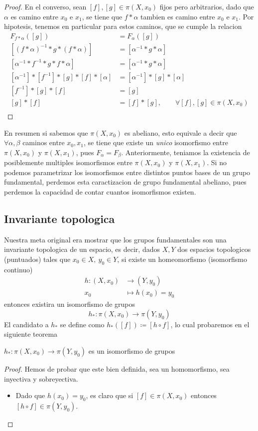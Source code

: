 {\begin{proof}
  En el converso, sean \([f],[g] \in \pi (X, x_0) \) fijos pero
  arbitrarios, dado que \(\alpha\) es camino entre \(x_0\) e \(x_1\), se
  tiene que \(f * \alpha\) tambien es camino entre \(x_0\) e \(x_1\).
Por hipotesis, tenemos en particular para estos caminos, que se cumple
la relacion
  \begin{align*}
    F_{f * \alpha} ([g]) &= F_{\alpha} ([g]) \\
    [(f * \alpha)^{-1} * g * (f * \alpha) ] &= [\alpha^{-1} * g * \alpha] \\
    [\alpha^{-1} * f^{-1} * g * f * \alpha ] &= [\alpha^{-1} * g * \alpha] \\
    [\alpha^{-1}] * [f^{-1}] * [g] * [f] * [\alpha] &= [\alpha^{-1}] *
        [g] * [\alpha] \\
    [f^{-1}] * [g] * [f] &= [g] \\
    [g] * [f] &= [f] * [g], \qquad \forall [f],[g] \in \pi (X, x_0) \\
  \end{align*}
\end{proof}
En resumen si sabemos que \(\pi (X, x_0)\) es abeliano, esto equivale a
decir que \(\forall \alpha,\beta\) caminos entre \(x_0, x_1\), se tiene
que existe un \emph{unico} isomorfismo entre \(\pi (X,x_0) \) y \( \pi
(X,x_1)\), pues \(F_\alpha = F_\beta\). Anteriormente, teniamos la
existencia de posiblemente multiples isomorfismos entre \(\pi (X, x_0)
\) y \(\pi (X, x_1) \). Si no podemos parametrizar los isomorfismos
entre distintos puntos bases de un grupo fundamental, perdemos esta
caractizacion de grupo fundamental abeliano, pues perdemos la capacidad
de contar cuantos isomorfismos existen.

\subsection{Invariante topologica}
Nuestra meta original era mostrar que los grupos fundamentales son una
invariante topologica de un espacio, es decir, dados \(X,Y\) dos
espacios topologicos (puntuados) tales que \(x_0 \in X,\ y_0 \in Y\), si
existe un homeomorfismo (isomorfismo continuo)
\begin{align*}
  h : (X, x_0) &\to (Y, y_0) \\
  x_0 &\mapsto h(x_0) = y_0
\end{align*}
entonces existira un isomorfismo de grupos
\[ h_{*} : \pi (X, x_0) \to \pi (Y, y_0) \]
El candidato a \(h_{*}\) se define como \(h_{*} ([f]) \coloneqq [h \circ
f] \), lo cual probaremos en el siguiente teorema
\begin{teorema} \label{thm:homoemorfismo-isomorfismo}
\(h_{*} : \pi (X, x_0) \to \pi (Y, y_0)\) es un isomorfismo de grupos
\end{teorema}
\begin{proof}
  Hemos de probar que este bien definida, sea un homomorfismo, sea
  inyectiva y sobreyectiva.
  \begin{itemize}
  \item Dado que \(h(x_0) = y_0\), es
    claro que si \([f] \in \pi (X, x_0) \) entonces \( [h \circ f] \in
    \pi (Y, y_0)\).


\end{itemize}
\end{proof}}

